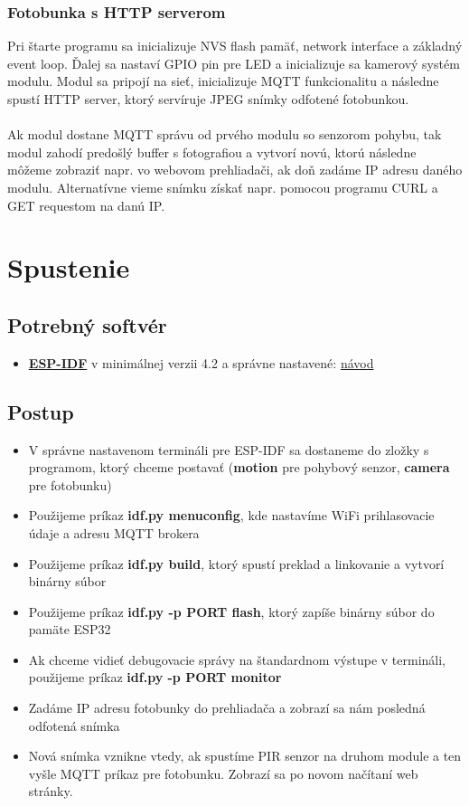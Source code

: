 \documentclass[a4paper,12pt]{article}
\begin{document}
\subsubsection{Fotobunka s HTTP serverom}
Pri štarte programu sa inicializuje NVS flash pamäť, network interface a základný event loop. Ďalej sa nastaví GPIO pin pre LED a inicializuje sa
kamerový systém modulu. Modul sa pripojí na sieť, inicializuje MQTT funkcionalitu a následne spustí HTTP server, ktorý servíruje JPEG snímky odfotené fotobunkou.
\\
\\
Ak modul dostane MQTT správu od prvého modulu so senzorom pohybu, tak modul zahodí predošlý buffer s fotografiou a vytvorí novú, ktorú následne môžeme zobraziť 
napr. vo webovom prehliadači, ak doň zadáme IP adresu daného modulu. Alternatívne vieme snímku získať napr. pomocou programu CURL a GET requestom na danú IP.

\section{Spustenie}

\subsection{Potrebný softvér}
\begin{itemize}
  \item \textbf{\href{https://github.com/espressif/esp-idf}{\color{blue}ESP-IDF}} v minimálnej verzii 4.2 a správne nastavené: \href{https://docs.espressif.com/projects/esp-idf/en/latest/esp32/get-started/}{\color{blue}návod}
\end{itemize}

\subsection{Postup}
\begin{itemize}
  \item V správne nastavenom termináli pre ESP-IDF sa dostaneme do zložky s programom, ktorý chceme postavať (\textbf{motion} pre pohybový senzor, \textbf{camera} pre fotobunku)
  \item Použijeme príkaz \textbf{idf.py menuconfig}, kde nastavíme WiFi prihlasovacie údaje a adresu MQTT brokera
  \item Použijeme príkaz \textbf{idf.py build}, ktorý spustí preklad a linkovanie a vytvorí binárny súbor
  \item Použijeme príkaz \textbf{idf.py -p PORT flash}, ktorý zapíše binárny súbor do pamäte ESP32
  \item Ak chceme vidieť debugovacie správy na štandardnom výstupe v termináli, použijeme príkaz \textbf{idf.py -p PORT monitor}
  \item Zadáme IP adresu fotobunky do prehliadača a zobrazí sa nám posledná odfotená snímka
  \item Nová snímka vznikne vtedy, ak spustíme PIR senzor na druhom module a ten vyšle MQTT príkaz pre fotobunku. Zobrazí sa po novom načítaní web stránky.
\end{itemize}
\end{document}
